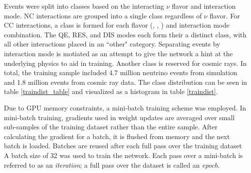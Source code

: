 Events were split into classes based on the interacting $\nu$ flavor and
\genie interaction mode.
NC interactions are grouped into a single class regardless of $\nu$ flavor.
For CC interactions, a class is formed for each flavor (\nue, \numu, \nutau)
and \genie interaction mode combination.
The QE, RES, and DIS modes each form their a distinct class, with
all other interactions placed in an ``other" category.
Separating events by interaction mode is motiated as an attempt to give
the network a hint at the underlying physics to aid in training.
Another class is reserved for cosmic rays.
In total, the training sample included 4.7 million neutrino events from \nova
simulation and 1.8 million events from cosmic ray data.
The class distribution can be seen in table \ref{traindist_table} and
visualized as a histogram in table \ref{traindist}.




Due to GPU memory constraints, a mini-batch training scheme was employed.
In mini-batch training, gradients used in weight updates are averaged over
small sub-samples of the training dataset rather than the entire sample.
After calculating the gradient for a batch, it is flushed from memory
and the next batch is loaded.
Batches are reused after each full pass over the training dataset
A batch size of 32 was used to train the network.
Each pass over a mini-batch is referred to as an \textit{iteration};
a full pass over the dataset is called an \textit{epoch}.



